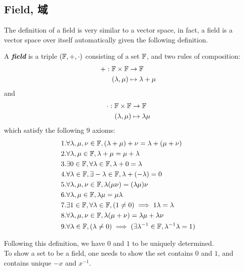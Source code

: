 \subsection{Field, 域}
The definition of a field is very similar to a vector space, in fact, a field is a vector space over itself automatically given the following definition.
\begin{definition}
    A \textbf{\textit{field}} is a triple $(\mathbb{F}, +, \cdot)$ consisting of a set $\mathbb{F}$, and two rules of composition:
    \begin{align*}
        +: \mathbb{F} \times \mathbb{F} & \to \mathbb{F} \\
        (\lambda, \mu) & \mapsto \lambda + \mu
    \end{align*}
    and
    \begin{align*}
        \cdot: \mathbb{F} \times \mathbb{F} & \to \mathbb{F} \\
        (\lambda, \mu) &\mapsto \lambda \mu
    \end{align*}
    which satisfy the following $9$ axioms:
    \begin{align*}
        & 1. \forall \lambda, \mu, \nu \in \mathbb{F}, (\lambda+\mu)+\nu = \lambda+(\mu+\nu) \\
        & 2. \forall \lambda, \mu \in \mathbb{F}, \lambda + \mu = \mu + \lambda \\
        & 3. \exists 0 \in \mathbb{F}, \forall \lambda \in \mathbb{F}, \lambda + 0 = \lambda \\
        & 4. \forall \lambda \in \mathbb{F}, \exists -\lambda \in \mathbb{F}, \lambda + (-\lambda) = 0 \\
        & 5. \forall \lambda, \mu, \nu \in \mathbb{F}, \lambda(\mu \nu) = (\lambda \mu) \nu \\
        & 6. \forall \lambda, \mu \in \mathbb{F}, \lambda \mu = \mu \lambda \\
        & 7. \exists 1 \in \mathbb{F}, \forall \lambda \in \mathbb{F}, (1 \ne 0) \implies 1 \lambda = \lambda \\
        & 8. \forall \lambda, \mu, \nu \in \mathbb{F}, \lambda(\mu + \nu) = \lambda \mu + \lambda \nu \\
        & 9. \forall \lambda \in \mathbb{F}, (\lambda \ne 0) \implies (\exists \lambda^{-1} \in \mathbb{F}, \lambda^{-1} \lambda = 1)
    \end{align*}
\end{definition}
Following this definition, we have $0$ and $1$ to be uniquely determined. \\
To show a set to be a field, one needs to show the set contains $0$ and $1$, and contains unique $-x$ and $x^{-1}$.

